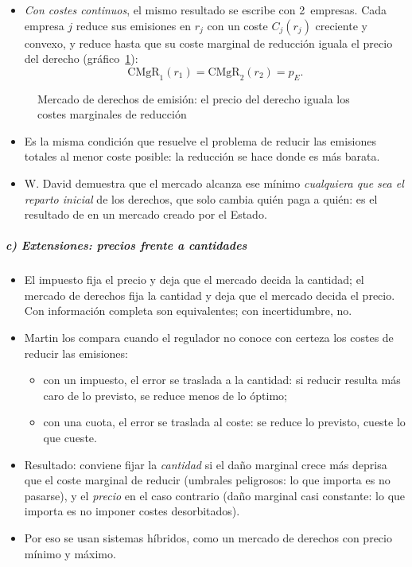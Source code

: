 \documentclass[11pt]{article}
\begin{document}
\begin{itemize}
\item \emph{Con costes continuos}, el mismo resultado se escribe con 2~empresas. Cada empresa $j$ reduce sus emisiones en $r_j$ con un coste $C_j(r_j)$ creciente y convexo, y reduce hasta que su coste marginal de reducción iguala el precio del derecho (gráfico~\ref{fig:cap-and-trade}):
  \begin{equation}\label{eq:cap-and-trade}
  \mathrm{CMgR}_1(r_1)=\mathrm{CMgR}_2(r_2)=p_E.
  \end{equation}
\end{itemize}

\begin{figure}[H]
\centering
\caption{Mercado de derechos de emisión: el precio del derecho iguala los costes marginales de reducción}\label{fig:cap-and-trade}
\end{figure}

\begin{itemize}
\item Es la misma condición que resuelve el problema de reducir las emisiones totales al menor coste posible: la reducción se hace donde es más barata.
\item W. David \textcite{Montgomery1972Markets} demuestra que el mercado alcanza ese mínimo \emph{cualquiera que sea el reparto inicial} de los derechos, que solo cambia quién paga a quién: es el resultado de  en un mercado creado por el Estado.
\end{itemize}

\subparagraph{c) Extensiones: precios frente a cantidades}
\begin{itemize}
\item El impuesto fija el precio y deja que el mercado decida la cantidad; el mercado de derechos fija la cantidad y deja que el mercado decida el precio. Con información completa son equivalentes; con incertidumbre, no.
\item Martin \textcite{Weitzman1974Prices} los compara cuando el regulador no conoce con certeza los costes de reducir las emisiones:
  \begin{itemize}
  \item con un impuesto, el error se traslada a la cantidad: si reducir resulta más caro de lo previsto, se reduce menos de lo óptimo;
  \item con una cuota, el error se traslada al coste: se reduce lo previsto, cueste lo que cueste.
  \end{itemize}
\item Resultado: conviene fijar la \emph{cantidad} si el daño marginal crece más deprisa que el coste marginal de reducir (umbrales peligrosos: lo que importa es no pasarse), y el \emph{precio} en el caso contrario (daño marginal casi constante: lo que importa es no imponer costes desorbitados).
\item Por eso se usan sistemas híbridos, como un mercado de derechos con precio mínimo y máximo\nocite{RobertsSpence1976Effluent}.
\end{itemize}
\end{document}
